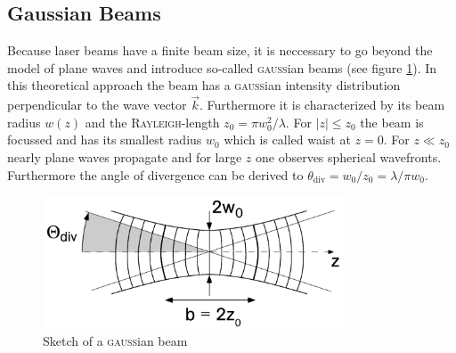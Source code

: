 \documentclass{protokoll_en}
\begin{document}
\subsection{Gaussian Beams}
Because laser beams have a finite beam size, it is neccessary to go beyond the model of plane waves and introduce so-called \textsc{gauss}ian beams (see figure \ref{fig:gaussianbeams}). In this theoretical approach the beam has a \textsc{gauss}ian intensity distribution perpendicular to the wave vector $\vec{k}$. Furthermore it is characterized by its beam radius $w(z)$ and the \textsc{Rayleigh}-length $z_0 = \pi w^2_0/\lambda$. For $|z| \leq z_0$ the beam is focussed and has its smallest radius $w_0$ which is called waist at $z=0$. For $z \ll z_0$ nearly plane waves propagate and for large $z$ one observes spherical wavefronts. Furthermore the angle of divergence can be derived to $\theta_{\mathrm{div}} = w_0/z_0 = \lambda/\pi w_0$.
\begin{figure}[H]
	\centering
		\includegraphics[width=0.8\textwidth]{graphics/gaussianbeams}
	\caption{Sketch of a \textsc{gauss}ian beam~\cite{meschi}}
	\label{fig:gaussianbeams}
\end{figure}
\end{document}
